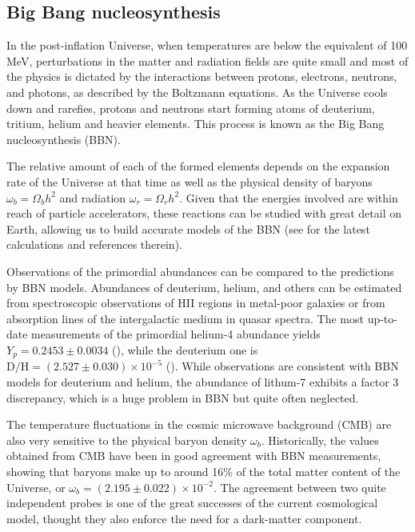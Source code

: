     \subsection{Big Bang nucleosynthesis}
    \label{intro:probes:bbn}

    In the post-inflation Universe, when temperatures
    are below the equivalent of 100 MeV, perturbations in the
    matter and radiation fields are quite 
    small and most of the physics is dictated by the interactions 
    between protons, electrons, neutrons, and photons,
    as described by the Boltzmann equations. 
    As the Universe cools down and rarefies, protons and neutrons 
    start forming atoms of deuterium, tritium, helium and heavier elements.
    This process is known as the Big Bang nucleosynthesis (BBN).

    The relative amount of each of the formed elements depends on the expansion rate 
    of the Universe at that time as well as the physical density of baryons 
    $\omega_b = \Omega_b h^2$ and radiation $\omega_r = \Omega_r h^2$.
    Given that the energies involved are within reach of particle 
    accelerators, these reactions can be studied with great detail on Earth,
    allowing us to build accurate models of the BBN 
    (see \cite{pitrouNewTensionCosmological2021} for the latest calculations
    and references therein). 
    
    Observations of the primordial abundances can be compared to the predictions 
    by BBN models. Abundances of deuterium, helium, and others can be estimated 
    from spectroscopic observations of HII regions in metal-poor galaxies 
    or from absorption lines of the intergalactic medium in quasar spectra. 
    The most up-to-date measurements of the primordial helium-4 abundance yields 
    $Y_p = 0.2453 \pm 0.0034$ (\cite{averImprovingHeliumAbundance2021}), while
    the deuterium one is $\mathrm{D/H} = (2.527 \pm 0.030) \times 10^{-5}$
    (\cite{pitrouNewTensionCosmological2021}). 
    While observations are consistent with BBN models for deuterium and helium, 
    the abundance of lithum-7 exhibits a factor 3 discrepancy, which is a huge problem 
    in BBN but quite often neglected. 
    
    The temperature fluctuations in the cosmic microwave background (CMB) are
    also very sensitive to the physical baryon density $\omega_b$. 
    Historically, the values obtained from CMB have been in good agreement 
    with BBN measurements, showing that baryons make up to around 16\% of the total 
    matter content of the Universe, or $\omega_b = (2.195 \pm  0.022)\times 10^{-2}$. 
    The agreement between two quite independent probes is one of the great successes 
    of the current cosmological model, thought they also enforce the need for a dark-matter 
    component.  

